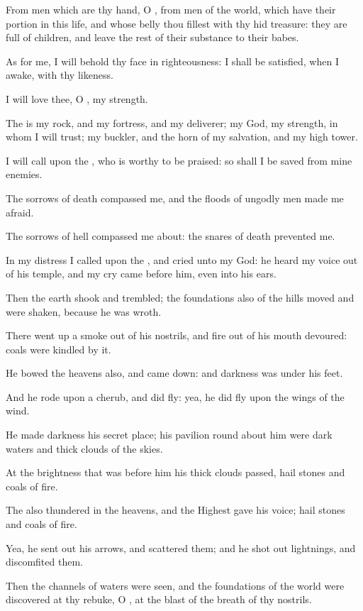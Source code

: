 \Verse From men which are thy hand, O \LORD, from men of the world, which have their portion in this life, and whose belly thou fillest with thy hid treasure: they are full of children, and leave the rest of their substance to their babes.

\Verse As for me, I will behold thy face in righteousness: I shall be satisfied, when I awake, with thy likeness.




\Chapter
\Verse I will love thee, O \LORD, my strength.

\Verse The \LORD is my rock, and my fortress, and my deliverer; my God, my strength, in whom I will trust; my buckler, and the horn of my salvation, and my high tower.

\Verse I will call upon the \LORD, who is worthy to be praised: so shall I be saved from mine enemies.

\Verse The sorrows of death compassed me, and the floods of ungodly men made me afraid.

\Verse The sorrows of hell compassed me about: the snares of death prevented me.

\Verse In my distress I called upon the \LORD, and cried unto my God: he heard my voice out of his temple, and my cry came before him, even into his ears.

\Verse Then the earth shook and trembled; the foundations also of the hills moved and were shaken, because he was wroth.

\Verse There went up a smoke out of his nostrils, and fire out of his mouth devoured: coals were kindled by it.

\Verse He bowed the heavens also, and came down: and darkness was under his feet.

\Verse And he rode upon a cherub, and did fly: yea, he did fly upon the wings of the wind.

\Verse He made darkness his secret place; his pavilion round about him were dark waters and thick clouds of the skies.

\Verse At the brightness that was before him his thick clouds passed, hail stones and coals of fire.

\Verse The \LORD also thundered in the heavens, and the Highest gave his voice; hail stones and coals of fire.

\Verse Yea, he sent out his arrows, and scattered them; and he shot out lightnings, and discomfited them.

\Verse Then the channels of waters were seen, and the foundations of the world were discovered at thy rebuke, O \LORD, at the blast of the breath of thy nostrils.

